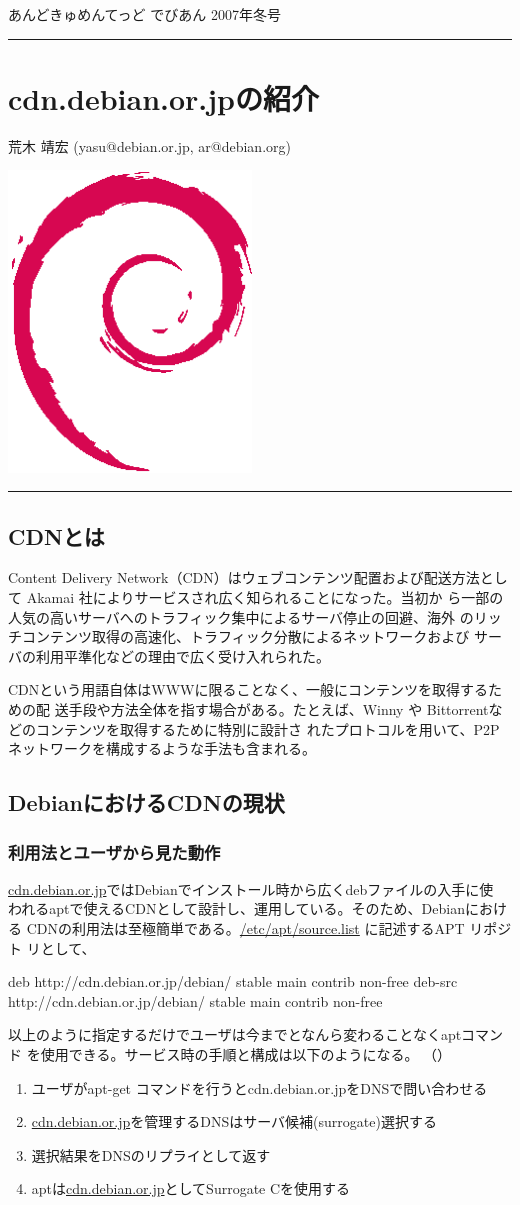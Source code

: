 \documentclass[mingoth,a4paper]{jsarticle}
\renewcommand{\dancersection}[2]{%
\newpage
あんどきゅめんてっど でびあん 2007年冬号
%
\vspace{0.1mm}\\
{\color{dancerlightblue}\rule{\hsize}{2mm}}

%
%
\begin{minipage}[t]{0.7\hsize}
\color{dancerdarkblue}
\vspace{1cm}
\section{#1}
\hfill{}#2\\
\end{minipage}
\begin{minipage}[t]{0.3\hsize}
\vspace{-2cm}
\hfill{}\includegraphics[height=8cm]{image200502/openlogo-nd.eps}\\
\vspace{-5cm}
\end{minipage}
%
%
{\color{dancerdarkblue}\rule{0.74\hsize}{2mm}}
%
\vspace{2cm}
}
\begin{document}
\dancersection{cdn.debian.or.jpの紹介}{荒木 靖宏 (yasu@debian.or.jp, ar@debian.org)}
\label{sec:cdndebianorjp}

\subsection{CDNとは}

Content Delivery Network（CDN）はウェブコンテンツ配置および配送方法として
Akamai 社によりサービスされ広く知られることになった。当初か
ら一部の人気の高いサーバへのトラフィック集中によるサーバ停止の回避、海外
のリッチコンテンツ取得の高速化、トラフィック分散によるネットワークおよび
サーバの利用平準化などの理由で広く受け入れられた。

CDNという用語自体はWWWに限ることなく、一般にコンテンツを取得するための配
送手段や方法全体を指す場合がある。たとえば、Winny や
Bittorrentなどのコンテンツを取得するために特別に設計さ
れたプロトコルを用いて、P2Pネットワークを構成するような手法も含まれる。

\subsection{DebianにおけるCDNの現状}
\subsubsection{利用法とユーザから見た動作}

\url{cdn.debian.or.jp}ではDebianでインストール時から広くdebファイルの入手に使
われるaptで使えるCDNとして設計し、運用している。そのため、Debianにおける
CDNの利用法は至極簡単である。\url{/etc/apt/source.list} に記述するAPT リポジト
リとして、

\begin{commandline}
 deb http://cdn.debian.or.jp/debian/ stable main contrib non-free
 deb-src http://cdn.debian.or.jp/debian/ stable main contrib non-free
\end{commandline}

以上のように指定するだけでユーザは今までとなんら変わることなくaptコマンド
を使用できる。サービス時の手順と構成は以下のようになる。
（）

\begin{enumerate}
 \item  ユーザがapt-get コマンドを行うとcdn.debian.or.jpをDNSで問い合わせる
 \item  \url{cdn.debian.or.jp}を管理するDNSはサーバ候補(surrogate)選択する
 \item  選択結果をDNSのリプライとして返す
 \item  aptは\url{cdn.debian.or.jp}としてSurrogate Cを使用する
\end{enumerate}
\end{document}
